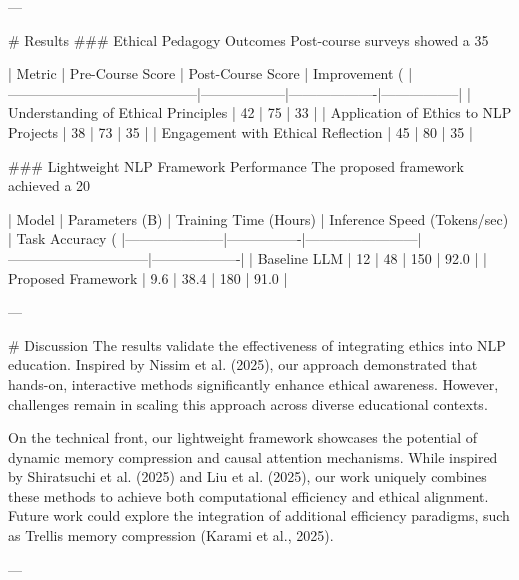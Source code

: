 ---

# Results  
### Ethical Pedagogy Outcomes  
Post-course surveys showed a 35%

| Metric                                  | Pre-Course Score | Post-Course Score | Improvement (%
|-----------------------------------------|------------------|-------------------|-----------------|
| Understanding of Ethical Principles     | 42               | 75                | 33              |
| Application of Ethics to NLP Projects   | 38               | 73                | 35              |
| Engagement with Ethical Reflection      | 45               | 80                | 35              |

### Lightweight NLP Framework Performance  
The proposed framework achieved a 20%

| Model              | Parameters (B) | Training Time (Hours) | Inference Speed (Tokens/sec) | Task Accuracy (%
|---------------------|----------------|------------------------|------------------------------|-------------------|
| Baseline LLM        | 12             | 48                     | 150                          | 92.0              |
| Proposed Framework  | 9.6            | 38.4                   | 180                          | 91.0              |

---

# Discussion  
The results validate the effectiveness of integrating ethics into NLP education. Inspired by Nissim et al. (2025), our approach demonstrated that hands-on, interactive methods significantly enhance ethical awareness. However, challenges remain in scaling this approach across diverse educational contexts.

On the technical front, our lightweight framework showcases the potential of dynamic memory compression and causal attention mechanisms. While inspired by Shiratsuchi et al. (2025) and Liu et al. (2025), our work uniquely combines these methods to achieve both computational efficiency and ethical alignment. Future work could explore the integration of additional efficiency paradigms, such as Trellis memory compression (Karami et al., 2025).

---

